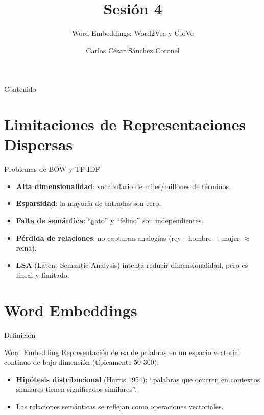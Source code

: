 \documentclass[aspectratio=169, 10pt, xcolor=table]{beamer}
\title[SESIÓN 4 NLP]{\textbf{Sesión 4}}
\subtitle{Word Embeddings: Word2Vec y GloVe}
\author[Prof. C. Sánchez]{Carlos César Sánchez Coronel}
\institute{\textbf{NLP}}
\date{}
\begin{document}
\begin{frame}
    \titlepage
\end{frame}

\begin{frame}{Contenido}
    \tableofcontents
\end{frame}

\section{Limitaciones de Representaciones Dispersas}

\begin{frame}{Problemas de BOW y TF-IDF}
    \begin{itemize}
        \item \textbf{Alta dimensionalidad}: vocabulario de miles/millones de términos.
        \item \textbf{Esparsidad}: la mayoría de entradas son cero.
        \item \textbf{Falta de semántica}: ``gato'' y ``felino'' son independientes.
        \item \textbf{Pérdida de relaciones}: no capturan analogías (rey - hombre + mujer $\approx$ reina).
        \item \textbf{LSA} (Latent Semantic Analysis) intenta reducir dimensionalidad, pero es lineal y limitado.
    \end{itemize}
\end{frame}

\section{Word Embeddings}

\begin{frame}{Definición}
    \begin{block}{Word Embedding}
        Representación densa de palabras en un espacio vectorial continuo de baja dimensión (típicamente 50-300).
    \end{block}
    \begin{itemize}
        \item \textbf{Hipótesis distribucional} (Harris 1954): ``palabras que ocurren en contextos similares tienen significados similares''.
        \item Las relaciones semánticas se reflejan como operaciones vectoriales.
    \end{itemize}
\end{frame}
\end{document}
